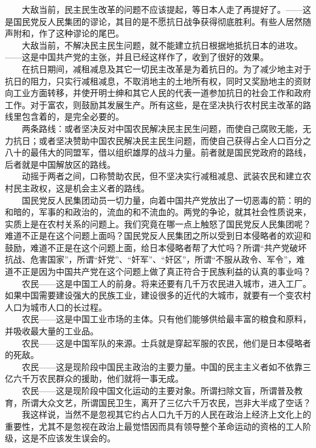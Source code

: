 \documentclass[cn,11pt,chinese]{elegantbook}
\begin{document}
　　大敌当前，民主民生改革的问题不应该提起，等日本人走了再提好了。——这是国民党反人民集团的谬论，其目的是不愿抗日战争获得彻底胜利。有些人居然随声附和，作了这种谬论的尾巴。\\
　　大敌当前，不解决民主民生问题，就不能建立抗日根据地抵抗日本的进攻。——这是中国共产党的主张，并且已经这样作了，收到了很好的效果。\\
　　在抗日期间，减租减息及其它一切民主改革是为着抗日的。为了减少地主对于抗日的阻力，只实行减租减息，不取消地主的土地所有权，同时又奖励地主的资财向工业方面转移，并使开明士绅和其它人民的代表一道参加抗日的社会工作和政府工作。对于富农，则鼓励其发展生产。所有这些，是在坚决执行农村民主改革的路线里包含着的，是完全必要的。\\
　　两条路线：或者坚决反对中国农民解决民主民生问题，而使自己腐败无能，无力抗日；或者坚决赞助中国农民解决民主民生问题，而使自己获得占全人口百分之八十的最伟大的同盟军，借以组织雄厚的战斗力量。前者就是国民党政府的路线，后者就是中国解放区的路线。\\
　　动摇于两者之间，口称赞助农民，但不坚决实行减租减息、武装农民和建立农村民主政权，这是机会主义者的路线。\\
　　国民党反人民集团动员一切力量，向着中国共产党放出了一切恶毒的箭：明的和暗的，军事的和政治的，流血的和不流血的。两党的争论，就其社会性质说来，实质上是在农村关系的问题上。我们究竟在哪一点上触怒了国民党反人民集团呢？难道不正是在这个问题上面吗？国民党反人民集团之所以受到日本侵略者的欢迎和鼓励，难道不正是在这个问题上面，给日本侵略者帮了大忙吗？所谓“共产党破坏抗战、危害国家”，所谓“奸党”、“奸军”、“奸区”，所谓“不服从政令、军令”，难道不正是因为中国共产党在这个问题上做了真正符合于民族利益的认真的事业吗？\\
　　农民——这是中国工人的前身。将来还要有几千万农民进入城市，进入工厂。如果中国需要建设强大的民族工业，建设很多的近代的大城市，就要有一个变农村人口为城市人口的长过程。\\
　　农民——这是中国工业市场的主体。只有他们能够供给最丰富的粮食和原料，并吸收最大量的工业品。\\
　　农民——这是中国军队的来源。士兵就是穿起军服的农民，他们是日本侵略者的死敌。\\
　　农民——这是现阶段中国民主政治的主要力量。中国的民主主义者如不依靠三亿六千万农民群众的援助，他们就将一事无成。\\
　　农民——这是现阶段中国文化运动的主要对象。所谓扫除文盲，所谓普及教育，所谓大众文艺，所谓国民卫生，离开了三亿六千万农民，岂非大半成了空话？\\
　　我这样说，当然不是忽视其它约占人口九千万的人民在政治上经济上文化上的重要性，尤其不是忽视在政治上最觉悟因而具有领导整个革命运动的资格的工人阶级，这是不应该发生误会的。\\
\end{document}
